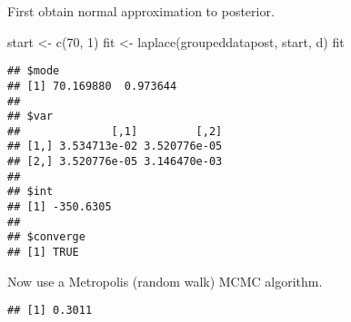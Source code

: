 \documentclass[
]{book}
\newenvironment{Shaded}{\begin{snugshade}}{\end{snugshade}}
\newcommand{\AttributeTok}[1]{\textcolor[rgb]{0.77,0.63,0.00}{#1}}
\newcommand{\DecValTok}[1]{\textcolor[rgb]{0.00,0.00,0.81}{#1}}
\newcommand{\FunctionTok}[1]{\textcolor[rgb]{0.00,0.00,0.00}{#1}}
\newcommand{\NormalTok}[1]{#1}
\newcommand{\OtherTok}[1]{\textcolor[rgb]{0.56,0.35,0.01}{#1}}
\newcommand{\SpecialCharTok}[1]{\textcolor[rgb]{0.00,0.00,0.00}{#1}}
\begin{document}
First obtain normal approximation to posterior.

\begin{Shaded}
\begin{Highlighting}[]
\NormalTok{start }\OtherTok{\textless{}{-}} \FunctionTok{c}\NormalTok{(}\DecValTok{70}\NormalTok{, }\DecValTok{1}\NormalTok{)}
\NormalTok{fit }\OtherTok{\textless{}{-}} \FunctionTok{laplace}\NormalTok{(groupeddatapost, start, d)}
\NormalTok{fit}
\end{Highlighting}
\end{Shaded}

\begin{verbatim}
## $mode
## [1] 70.169880  0.973644
## 
## $var
##              [,1]         [,2]
## [1,] 3.534713e-02 3.520776e-05
## [2,] 3.520776e-05 3.146470e-03
## 
## $int
## [1] -350.6305
## 
## $converge
## [1] TRUE
\end{verbatim}

Now use a Metropolis (random walk) MCMC algorithm.

\begin{Shaded}
\end{Shaded}

\begin{Shaded}
\end{Shaded}

\begin{verbatim}
## [1] 0.3011
\end{verbatim}

\begin{Shaded}
\end{Shaded}
\end{document}
